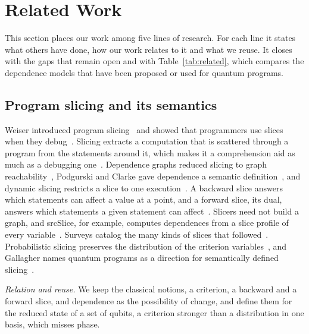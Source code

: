 \section{Related Work}\label{sec:related}

This section places our work among five lines of research. For each line it states what others have done, how our
work relates to it and what we reuse. It closes with the gaps that remain open and with Table~\ref{tab:related},
which compares the dependence models that have been proposed or used for quantum programs.

\subsection{Program slicing and its semantics}
Weiser introduced program slicing~\cite{weiser1984program} and showed that programmers use slices when they
debug~\cite{weiser1982programmers}. Slicing extracts a computation that is scattered through a program from the
statements around it, which makes it a comprehension aid as much as a debugging one~\cite{binkley2007source}.
Dependence graphs reduced slicing to graph reachability~\cite{ottenstein1984pdg, ferrante1987pdg,
horwitz1990interprocedural}, Podgurski and Clarke gave dependence a semantic definition~\cite{podgurski1990formal},
and dynamic slicing restricts a slice to one execution~\cite{korel1988dynamic, agrawal1990dynamic}. A backward slice
answers which statements can affect a value at a point, and a forward slice, its dual, answers which statements a
given statement can affect~\cite{tip1994a, horwitz1990interprocedural}. Slicers need not build a graph, and srcSlice,
for example, computes dependences from a slice profile of every variable~\cite{alomari2014srcslice}. Surveys catalog
the many kinds of slices that followed~\cite{tip1994a, silva2012vocabulary, binkley2004a}. Probabilistic slicing
preserves the distribution of the criterion variables~\cite{hur2014slicing, amtoft2020theory, olmedo2025slicing}, and
Gallagher names quantum programs as a direction for semantically defined slicing~\cite{gallagher2025program}.

\emph{Relation and reuse.} We keep the classical notions, a criterion, a backward and a forward slice, and dependence
as the possibility of change, and define them for the reduced state of a set of qubits, a criterion stronger than a
distribution in one basis, which misses phase.

